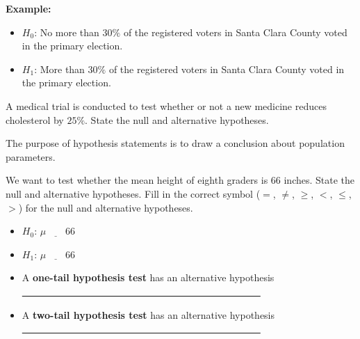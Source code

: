 \documentclass[12pt, letterpaper]{article}
\newcounter{exercise}
\theoremstyle{definition}
\begin{document}
\begin{statement}
\noindent\textbf{Example:}
\begin{itemize}
\item $H_0$: No more than $30\%$ of the registered voters in Santa Clara County voted in the primary election. 
\item $H_1$: More than $30\%$ of the registered voters in Santa Clara County voted in the primary election. 
\end{itemize}
\end{statement}

\begin{exercise}
A medical trial is conducted to test whether or not a new medicine reduces cholesterol by $25\%$. State the null and alternative hypotheses.

\end{exercise}

\vfill

\begin{statement}
\noindent The purpose of hypothesis statements is to draw a conclusion about population parameters.
\end{statement}

\begin{exercise}
We want to test whether the mean height of eighth graders is $66$ inches. State the null and alternative hypotheses. Fill in the correct symbol ($=$, $\neq$, $\geq$, $<$, $\leq $, $>$) for the null and alternative hypotheses.


\end{exercise}

\begin{itemize}
\item $H_0$:  $\mu\underline{~~~~~~~~~}66$
\vspace*{.1in}
\item $H_1$:  $\mu\underline{~~~~~~~~~}66$\vspace*{.1in}

\end{itemize}

\begin{statement}
\begin{itemize}
\item A \textbf{one-tail hypothesis test} has an alternative hypothesis\\

\vspace*{.2in} \underline{~~~~~~~~~~~~~~~~~~~~~~~~~~~~~~~~~~~~~~~~~~~~~~~~~}

\item A \textbf{two-tail hypothesis test} has an alternative hypothesis\\

\vspace*{.2in} \underline{~~~~~~~~~~~~~~~~~~~~~~~~~~~~~~~~~~~~~~~~~~~~~~~~~}


\end{itemize}
\end{statement}
\end{document}
